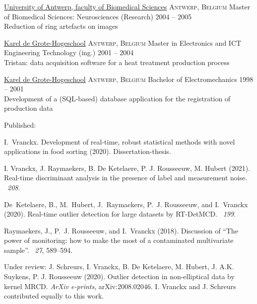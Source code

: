 \documentclass[10pt,a4paper]{article}
\begin{document}
\vspace{+0.2em}
\headedsection
  {\href{https://www.uantwerpen.be/en/}{University of Antwerp, faculty of Biomedical Sciences}}
  {\textsc{Antwerp, Belgium}} {%
  \headedsubsection
    {Master of Biomedical Sciences: Neurosciences (Research)}
    {2004 -- 2005} {\\Reduction of ring artefacts on  images}
}

\vspace{+0.2em}
\headedsection
{\href{https://www.kdg.be/}{Karel de Grote-Hogeschool}}
{\textsc{Antwerp, Belgium}} {%
	\headedsubsection
	{Master in Electronics and ICT Engineering Technology (ing.)}
	{2001 -- 2004} {\\Tristan: data acquisition software for a heat treatment production process}
}

\vspace{+0.2em}
\headedsection
{\href{https://www.kdg.be/}{Karel de Grote-Hogeschool}}
{\textsc{Antwerp, Belgium}} {%
	\headedsubsection
	{Bachelor of Electromechanics}
	{1998 -- 2001} {\\Development of a (SQL-based) database application for the registration of production data}
}

\spacedhrule{0.5em}{-0.4em}


\inlineheadsection  %
{Published:}
{
	I.~Vranckx. Development of real-time, robust statistical methods with novel applications in food sorting (2020). Dissertation-thesis.
	
	\hangindent=3.5mm
	I. Vranckx, J. Raymaekers, B. De Ketelaere, P. J. Rousseeuw, M. Hubert (2021).
	\newblock Real-time discriminant analysis in the presence of label and measurement noise.
	~{\em 208}.
	
	De~Ketelaere, B., M.~Hubert, J.~Raymaekers, P.~J. Rousseeuw, and I.~Vranckx	(2020).
	\newblock Real-time outlier detection for large datasets by {RT-DetMCD}.
	~{\em 199}. 
		
	Raymaekers, J., P.~J. Rousseeuw, and I.~Vranckx (2018).
	\newblock Discussion of ``{T}he power of monitoring: how to make the most of a contaminated multivariate sample''.
	~{\em 27}, 589--594. 
}
\vspace{0.5em}
\inlineheadsection
{Under review:}
{J. Schreurs, I. Vranckx, B. De Ketelaere, M. Hubert, J. A.K. Suykens, P. J. Rousseeuw (2020). Outlier detection in non-elliptical data by kernel MRCD. \textit{ArXiv e-prints}, arXiv:2008.02046. I. Vranckx and J. Schreurs contributed equally to this work.}
\end{document}
